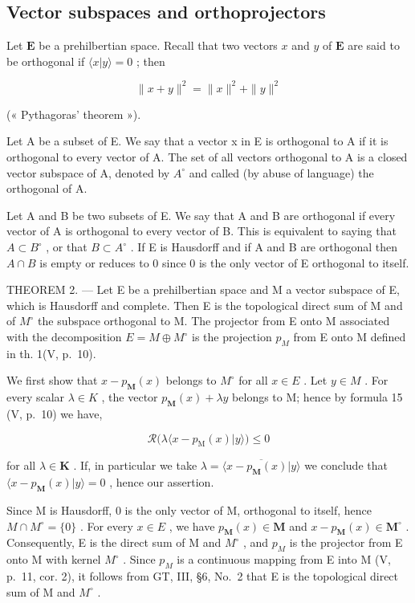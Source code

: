 \subsection{Vector subspaces and orthoprojectors}

Let \(\mathbf{E}\) be a prehilbertian space. Recall that two vectors \(x\) and \(y\) of \(\mathbf{E}\) are said to be orthogonal if \(\langle x|y\rangle = 0\) ; then

\[
\| x + y \| ^ {2} = \| x \| ^ {2} + \| y \| ^ {2}\tag{16}
\]

(« Pythagoras' theorem »).

Let A be a subset of E. We say that a vector x in E is orthogonal to A if it is orthogonal to every vector of A. The set of all vectors orthogonal to A is a closed vector subspace of A, denoted by \(A^{\circ}\) and called (by abuse of language) the orthogonal of A.

Let A and B be two subsets of E. We say that A and B are orthogonal if every vector of A is orthogonal to every vector of B. This is equivalent to saying that \(A \subset B^{\circ}\) , or that \(B \subset A^{\circ}\) . If E is Hausdorff and if A and B are orthogonal then \(A \cap B\) is empty or reduces to 0 since 0 is the only vector of E orthogonal to itself.

THEOREM 2. --- Let E be a prehilbertian space and M a vector subspace of E, which is Hausdorff and complete. Then E is the topological direct sum of M and of \(M^{\circ}\) the subspace orthogonal to M. The projector from E onto M associated with the decomposition \(E = M \oplus M^{\circ}\) is the projection \(p_{M}\) from E onto M defined in th. 1(V, p.~10).

We first show that \(x - p_{\mathbf{M}}(x)\) belongs to \(M^{\circ}\) for all \(x \in E\) . Let \(y \in M\) . For every scalar \(\lambda \in K\) , the vector \(p_{\mathbf{M}}(x) + \lambda y\) belongs to M; hence by formula 15 (V, p.~10) we have,

\[
\mathcal {R} \big (\lambda \langle x - p _ {\mathrm{M}} (x) | y \rangle \big) \leqslant 0
\]

for all \(\lambda \in \mathbf{K}\) . If, in particular we take \(\lambda = \overline{\langle x - p_{\mathbf{M}}(x)|y\rangle}\) we conclude that \(\langle x - p_{\mathbf{M}}(x)|y\rangle = 0\) , hence our assertion.

Since M is Hausdorff, 0 is the only vector of M, orthogonal to itself, hence \(M \cap M^{\circ} = \{0\}\) . For every \(x \in E\) , we have \(p_{\mathbf{M}}(x) \in \mathbf{M}\) and \(x - p_{\mathbf{M}}(x) \in \mathbf{M}^{\circ}\) . Consequently, E is the direct sum of M and \(M^{\circ}\) , and \(p_{M}\) is the projector from E onto M with kernel \(M^{\circ}\) . Since \(p_{M}\) is a continuous mapping from E into M (V, p.~11, cor. 2), it follows from GT, III, §6, No.~2 that E is the topological direct sum of M and \(M^{\circ}\) .

